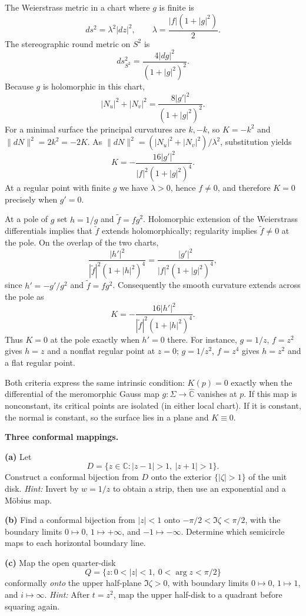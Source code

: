 \begin{solution}
The Weierstrass metric in a chart where $g$ is finite is
\[
ds^2=\lambda^2|dz|^2,
\qquad \lambda=\frac{|f|(1+|g|^2)}2.
\]
The stereographic round metric on $S^2$ is
\[
ds_{S^2}^2=\frac{4|dg|^2}{(1+|g|^2)^2}.
\]
Because $g$ is holomorphic in this chart,
\[
|N_u|^2+|N_v|^2=\frac{8|g'|^2}{(1+|g|^2)^2}.
\]
For a minimal surface the principal curvatures are $k,-k$, so
$K=-k^2$ and $\|dN\|^2=2k^2=-2K$. As
$\|dN\|^2=(|N_u|^2+|N_v|^2)/\lambda^2$, substitution yields
\[
\boxed{K=-\frac{16|g'|^2}{|f|^2(1+|g|^2)^4}}.
\]
At a regular point with finite $g$ we have $\lambda>0$, hence $f\ne0$,
and therefore $K=0$ precisely when $g'=0$.

At a pole of $g$ set $h=1/g$ and $\widetilde f=fg^2$.
Holomorphic extension of the Weierstrass differentials implies that
$\widetilde f$ extends holomorphically; regularity implies
$\widetilde f\ne0$ at the pole. On the overlap of the two charts,
\[
\frac{|h'|^2}{|\widetilde f|^2(1+|h|^2)^4}
=
\frac{|g'|^2}{|f|^2(1+|g|^2)^4},
\]
since $h'=-g'/g^2$ and $\widetilde f=fg^2$.
Consequently the smooth curvature extends across the pole as
\[
\boxed{K=-\frac{16|h'|^2}
{|\widetilde f|^2(1+|h|^2)^4}}.
\]
Thus $K=0$ at the pole exactly when $h'=0$ there. For instance,
$g=1/z$, $f=z^2$ gives $h=z$ and a nonflat regular point at $z=0$;
$g=1/z^2$, $f=z^4$ gives $h=z^2$ and a flat regular point.

Both criteria express the same intrinsic condition: $K(p)=0$ exactly
when the differential of the meromorphic Gauss map
$g:\Sigma\to\widehat{\mathbb C}$ vanishes at $p$. If this map is
nonconstant, its critical points are isolated (in either local chart).
If it is constant, the normal is constant, so the surface lies in a
plane and $K\equiv0$.
\end{solution}


\begin{problem}[CP-IV-0016]
\label{prob:cp-iv-0016}
\textbf{Three conformal mappings.}

\par\medskip\noindent\textbf{(a)} Let
\[
D=\{z\in\mathbb C:|z-1|>1,\ |z+1|>1\}.
\]
Construct a conformal bijection from $D$ onto the exterior $\{|\zeta|>1\}$ of the unit disk.
\emph{Hint:} Invert by $w=1/z$ to obtain a strip, then use an exponential and a M\"obius map.

\par\medskip\noindent\textbf{(b)} Find a conformal bijection from $|z|<1$ onto
$-\pi/2<\Im\zeta<\pi/2$, with the boundary limits
$0\mapsto0$, $1\mapsto+\infty$, and $-1\mapsto-\infty$.
Determine which semicircle maps to each horizontal boundary line.

\par\medskip\noindent\textbf{(c)} Map the open quarter-disk
\[
Q=\{z:0<|z|<1,\ 0<\arg z<\pi/2\}
\]
conformally \emph{onto} the upper half-plane $\Im\zeta>0$, with boundary limits
$0\mapsto0$, $1\mapsto1$, and $i\mapsto\infty$.
\emph{Hint:} After $t=z^2$, map the upper half-disk to a quadrant before squaring again.
\end{problem}

